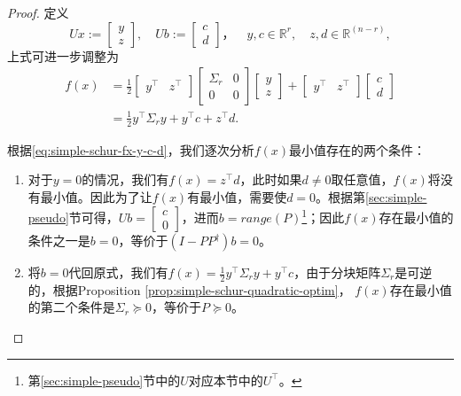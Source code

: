 \begin{subappendices}
\begin{proof}
  定义
  \begin{equation*}
    U x :=
    \begin{bmatrix}
    y \\ z
    \end{bmatrix},
    \quad U b :=
    \begin{bmatrix}
    c \\ d
  \end{bmatrix}，
  \quad y,c \in \mathbb{R}^{r},
  \quad z,d \in \mathbb{R}^{(n-r) },
  \end{equation*}
  上式可进一步调整为
  \begin{equation}
    \label{eq:simple-schur-fx-y-c-d}
  \begin{split}
    f(x) &= \frac{1}{2} \begin{bmatrix}
    y^{\top} & z^{\top}
    \end{bmatrix} \begin{bmatrix}
  \Sigma_r & 0 \\ 0 & 0
  \end{bmatrix} \begin{bmatrix}
  y \\ z
  \end{bmatrix} + \begin{bmatrix}
  y^{\top} & z^{\top}
  \end{bmatrix} \begin{bmatrix}
  c \\ d
  \end{bmatrix} \\
  &= \frac{1}{2} y^{\top} \Sigma_r y + y^{\top} c + z^{\top} d.
  \end{split}
  \end{equation}

  根据\eqref{eq:simple-schur-fx-y-c-d}，我们逐次分析$f(x)$最小值存在的两个条件：
  \begin{enumerate}
    \item 对于$y =0$的情况，我们有$f(x) = z^{\top} d$，此时如果$d \neq 0$取任意值，$f(x)$将没有最小值。因此为了让$f(x)$有最小值，需要使$d = 0$。根据第\ref{sec:simple-pseudo}节可得，$U b= \begin{bmatrix} c \\ 0 \end{bmatrix}$，进而$b = range(P)$\footnote{第\ref{sec:simple-pseudo}节中的$U$对应本节中的$U^{\top}$。}；因此$f(x)$存在最小值的条件之一是$b=0$，等价于$\left(I-PP^{\dagger}\right) b = 0$。
    \item  将$b=0$代回原式，我们有$f(x) = \frac{1}{2} y^{\top} \Sigma_r y + y^{\top} c$，由于分块矩阵$\Sigma_{r}$是可逆的，根据Proposition \ref{prop:simple-schur-quadratic-optim}， $f(x)$存在最小值的第二个条件是$\Sigma_{r} \succeq 0$，等价于$P \succeq 0$。
  \end{enumerate}


\end{proof}
\end{subappendices}
